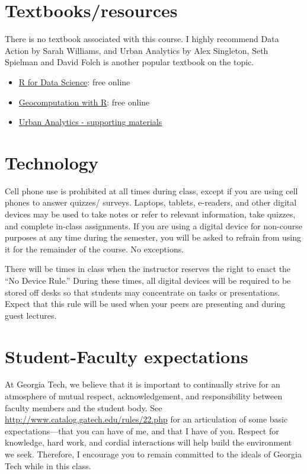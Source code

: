 \documentclass[
]{article}
\providecommand{\tightlist}{%
  \setlength{\itemsep}{0pt}\setlength{\parskip}{0pt}}
\begin{document}
\hypertarget{textbooksresources}{%
\section{Textbooks/resources}\label{textbooksresources}}

There is no textbook associated with this course. I highly recommend
Data Action by Sarah Williams, and Urban Analytics by Alex Singleton,
Seth Spielman and David Folch is another popular textbook on the topic.

\begin{itemize}
\tightlist
\item
  \href{https://r4ds.had.co.nz/}{R for Data Science}: free online
\item
  \href{https://rpubs.com/spring19cp6521/Syllabus}{Geocomputation with
  R}: free online
\item
  \href{https://github.com/alexsingleton/urban_analytics}{Urban
  Analytics - supporting materials}
\end{itemize}

\hypertarget{technology}{%
\section{Technology}\label{technology}}

Cell phone use is prohibited at all times during class, except if you
are using cell phones to answer quizzes/ surveys. Laptops, tablets,
e-readers, and other digital devices may be used to take notes or refer
to relevant information, take quizzes, and complete in-class
assignments. If you are using a digital device for non-course purposes
at any time during the semester, you will be asked to refrain from using
it for the remainder of the course. No exceptions.

There will be times in class when the instructor reserves the right to
enact the ``No Device Rule.'' During these times, all digital devices
will be required to be stored off desks so that students may concentrate
on tasks or presentations. Expect that this rule will be used when your
peers are presenting and during guest lectures.

\hypertarget{student-faculty-expectations}{%
\section{Student-Faculty
expectations}\label{student-faculty-expectations}}

At Georgia Tech, we believe that it is important to continually strive
for an atmosphere of mutual respect, acknowledgement, and responsibility
between faculty members and the student body. See
\url{http://www.catalog.gatech.edu/rules/22.php} for an articulation of
some basic expectations---that you can have of me, and that I have of
you. Respect for knowledge, hard work, and cordial interactions will
help build the environment we seek. Therefore, I encourage you to remain
committed to the ideals of Georgia Tech while in this class.
\end{document}
